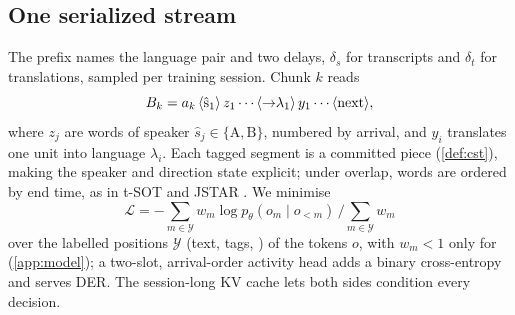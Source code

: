 \subsection{One serialized stream}\label{sec:model-stream}
The prefix names the language pair and two delays, $\delta_s$ for transcripts and $\delta_t$ for translations, sampled per training session.
Chunk $k$ reads
\begin{equation}\label{eq:chunk}
  B_k = a_k\,\langle\mathrm{\hat s_1}\rangle\,z_1\cdots\langle\mathrm{{\to}\lambda_1}\rangle\,y_1\cdots\langle\mathrm{next}\rangle,
\end{equation}
where $z_j$ are words of speaker $\hat s_j\in\{\mathrm{A},\mathrm{B}\}$, numbered by arrival, and $y_i$ translates one unit into language $\lambda_i$.
Each tagged segment is a committed piece (\cref{def:cst}), making the speaker and direction state explicit; under overlap, words are ordered by end time, as in t-SOT \citep{kanda2022streaming} and JSTAR \citep{moritz2025transcribing}.
We minimise
\begin{equation}\label{eq:loss}
  \mathcal{L}=-\textstyle\sum_{m\in\mathcal{Y}}w_m\log p_\theta(o_m\mid o_{<m})\,\big/\sum_{m\in\mathcal{Y}}w_m
\end{equation}
over the labelled positions $\mathcal{Y}$ (text, tags, ) of the tokens $o$, with $w_m<1$ only for  (\cref{app:model}); a two-slot, arrival-order activity head \citep{park2025sortformer} adds a binary cross-entropy and serves DER.
The session-long KV cache lets both sides condition every decision.

